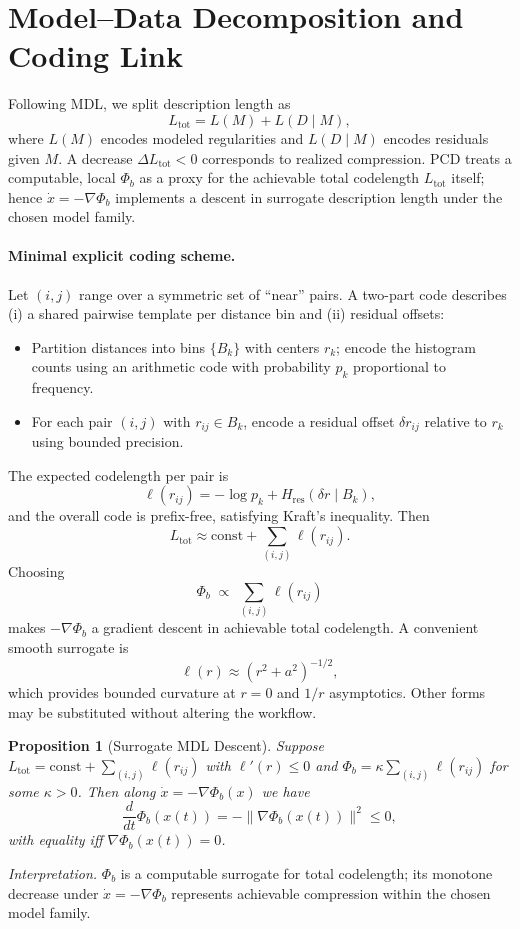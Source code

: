 \documentclass[11pt,a4paper]{article}
\numberwithin{equation}{section}
\newtheorem{proposition}{Proposition}[section]
\begin{document}
\section{Model--Data Decomposition and Coding Link}
Following MDL, we split description length as
\begin{equation}
\label{eq:Ltot}
L_{\text{tot}} = L(M) + L(D\mid M),
\end{equation}
where $L(M)$ encodes modeled regularities and $L(D\mid M)$ encodes residuals given $M$. A decrease $\Delta L_{\text{tot}}<0$ corresponds to realized compression. PCD treats a computable, local $\Phi_b$ as a proxy for the achievable total codelength $L_{\text{tot}}$ itself; hence $\dot x=-\nabla\Phi_b$ implements a descent in surrogate description length under the chosen model family.

\paragraph{Minimal explicit coding scheme.}
Let $(i,j)$ range over a symmetric set of ``near'' pairs. A two-part code describes (i) a shared pairwise template per distance bin and (ii) residual offsets:
\begin{itemize}
\item Partition distances into bins $\{B_k\}$ with centers $r_k$; encode the histogram counts using an arithmetic code with probability $p_k$ proportional to frequency.
\item For each pair $(i,j)$ with $r_{ij}\in B_k$, encode a residual offset $\delta r_{ij}$ relative to $r_k$ using bounded precision.
\end{itemize}
The expected codelength per pair is
\[
\ell(r_{ij}) = -\log p_k + H_{\mathrm{res}}(\delta r \mid B_k),
\]
and the overall code is prefix-free, satisfying Kraft’s inequality. Then
\begin{equation}
\label{eq:Ltotsum}
L_{\text{tot}} \approx \text{const} + \sum_{(i,j)} \ell(r_{ij}).
\end{equation}
Choosing
\[
\Phi_b \;\propto\; \sum_{(i,j)} \ell(r_{ij})
\]
makes $-\nabla\Phi_b$ a gradient descent in achievable total codelength. A convenient smooth surrogate is
\[
\ell(r)\approx (r^2+a^2)^{-1/2},
\]
which provides bounded curvature at $r=0$ and $1/r$ asymptotics. Other forms may be substituted without altering the workflow.

\begin{proposition}[Surrogate MDL Descent]
\label{prop:mdl-descent}
Suppose $L_{\text{tot}}=\mathrm{const}+\sum_{(i,j)}\ell(r_{ij})$ with $\ell'(r)\le 0$ and $\Phi_b=\kappa\sum_{(i,j)}\ell(r_{ij})$ for some $\kappa>0$. 
Then along $\dot x=-\nabla\Phi_b(x)$ we have
\begin{equation}
\frac{d}{dt}\Phi_b(x(t))=-\|\nabla\Phi_b(x(t))\|^2\le0,
\end{equation}
with equality iff $\nabla\Phi_b(x(t))=0$.
\end{proposition}
\noindent\emph{Interpretation.} $\Phi_b$ is a computable surrogate for total codelength; its monotone decrease under $\dot x=-\nabla\Phi_b$ represents achievable compression within the chosen model family.
\end{document}
